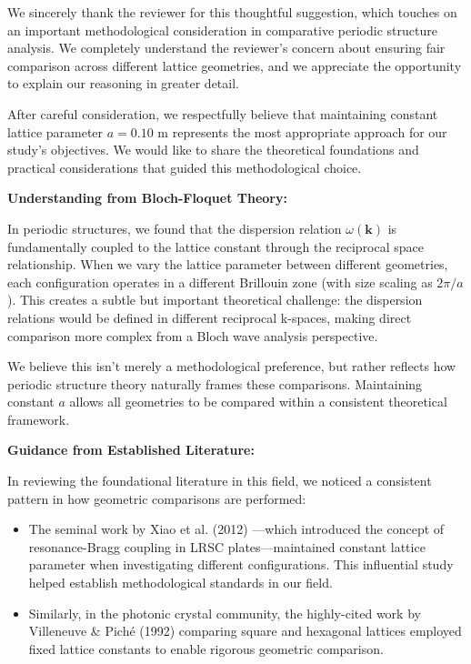 \documentclass[11pt,a4paper]{article}
\newenvironment{responsebox}{%
    \par\medskip\noindent{\color{responsecolor}\rule{\linewidth}{2pt}}\par
    \noindent{\color{responsecolor}\bfseries Response}\par\smallskip
}{%
    \par\noindent{\color{responsecolor}\rule{\linewidth}{0.5pt}}\medskip
}
\begin{document}
\begin{responsebox}
We sincerely thank the reviewer for this thoughtful suggestion, which touches on an important methodological consideration in comparative periodic structure analysis. We completely understand the reviewer's concern about ensuring fair comparison across different lattice geometries, and we appreciate the opportunity to explain our reasoning in greater detail.

After careful consideration, we respectfully believe that maintaining constant lattice parameter $a = 0.10$ m represents the most appropriate approach for our study's objectives. We would like to share the theoretical foundations and practical considerations that guided this methodological choice.

\textbf{Understanding from Bloch-Floquet Theory:}

In periodic structures, we found that the dispersion relation $\omega(\mathbf{k})$ is fundamentally coupled to the lattice constant through the reciprocal space relationship. When we vary the lattice parameter between different geometries, each configuration operates in a different Brillouin zone (with size scaling as $2\pi/a$). This creates a subtle but important theoretical challenge: the dispersion relations would be defined in different reciprocal k-spaces, making direct comparison more complex from a Bloch wave analysis perspective.

We believe this isn't merely a methodological preference, but rather reflects how periodic structure theory naturally frames these comparisons. Maintaining constant $a$ allows all geometries to be compared within a consistent theoretical framework.

\textbf{Guidance from Established Literature:}

In reviewing the foundational literature in this field, we noticed a consistent pattern in how geometric comparisons are performed:

\begin{itemize}
    \item The seminal work by Xiao et al. (2012) \cite{Xiao2012}—which introduced the concept of resonance-Bragg coupling in LRSC plates—maintained constant lattice parameter when investigating different configurations. This influential study helped establish methodological standards in our field.

    \item Similarly, in the photonic crystal community, the highly-cited work by Villeneuve \& Piché (1992) comparing square and hexagonal lattices employed fixed lattice constants to enable rigorous geometric comparison.
\end{itemize}


\end{responsebox}
\end{document}
